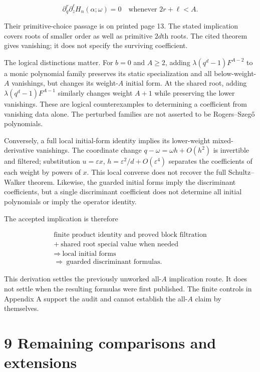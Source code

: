 \documentclass[
  11pt,
]{article}
\begin{document}
\[
\partial_q^r\partial_z^\ell H_n(\alpha;\omega)=0
\quad\text{whenever }2r+\ell<A. \tag{28}
\]

Their primitive-choice passage is on printed page 13. The stated
implication covers roots of smaller order as well as primitive \(2d\)th
roots. The cited theorem gives vanishing; it does not specify the
surviving coefficient.

The logical distinctions matter. For \(b=0\) and \(A\geq2\), adding
\(\lambda(q^d-1)F^{A-2}\) to a monic polynomial family preserves its
static specialization and all below-weight-\(A\) vanishings, but changes
its weight-\(A\) initial form. At the shared root, adding
\(\lambda(q^d-1)F^{A-1}\) similarly changes weight \(A+1\) while
preserving the lower vanishings. These are logical counterexamples to
determining a coefficient from vanishing data alone. The perturbed
families are not asserted to be Rogers--Szegő polynomials.

Conversely, a full local initial-form identity implies its lower-weight
mixed-derivative vanishings. The coordinate change
\(q-\omega=\omega h+O(h^2)\) is invertible and filtered; substitution
\(u=\varepsilon x\), \(h=\varepsilon^2/d+O(\varepsilon^4)\) separates
the coefficients of each weight by powers of \(x\). This local converse
does not recover the full Schultz--Walker theorem. Likewise, the guarded
initial forms imply the discriminant coefficients, but a single
discriminant coefficient does not determine all initial polynomials or
imply the operator identity.

The accepted implication is therefore

\[
\begin{gathered}
\text{finite product identity and proved block filtration}\\
+\ \text{shared root special value when needed}\\
\Longrightarrow\ \text{local initial forms}\\
\Longrightarrow\ \text{guarded discriminant formulas}.
\end{gathered}
\]

This derivation settles the previously unworked all-\(A\) implication
route. It does not settle when the resulting formulas were first
published. The finite controls in Appendix A support the audit and
cannot establish the all-\(A\) claim by themselves.

\section{9 Remaining comparisons and
extensions}\label{remaining-comparisons-and-extensions}
\end{document}
